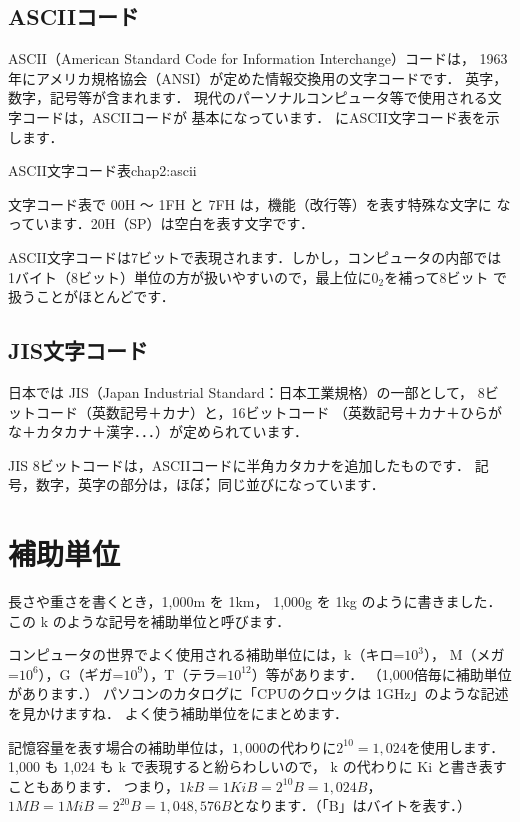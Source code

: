 \subsection{ASCIIコード}
\label{ascii}
ASCII（American Standard Code for Information Interchange）コードは，
1963年にアメリカ規格協会（ANSI）が定めた情報交換用の文字コードです．
英字，数字，記号等が含まれます．
現代のパーソナルコンピュータ等で使用される文字コードは，ASCIIコードが
基本になっています．
にASCII文字コード表を示します．

          {ASCII文字コード表}{chap2:ascii}

文字コード表で 00H 〜 1FH と 7FH は，機能（改行等）を表す特殊な文字に
なっています．20H（SP）は空白を表す文字です．

ASCII文字コードは7ビットで表現されます．しかし，コンピュータの内部では
1バイト（8ビット）単位の方が扱いやすいので，最上位に$0_2$を補って8ビット
で扱うことがほとんどです．

\subsection{JIS文字コード}
日本では JIS（Japan Industrial Standard：日本工業規格）の一部として，
8ビットコード（英数記号＋カナ）と，16ビットコード
（英数記号＋カナ＋ひらがな＋カタカナ＋漢字．．．）が定められています．

JIS 8ビットコードは，ASCIIコードに半角カタカナを追加したものです．
記号，数字，英字の部分は，\.ほ\.ぼ，同じ並びになっています．

\section{補助単位}

長さや重さを書くとき，1,000m を 1km， 1,000g を 1kg のように書きました．
この k のような記号を補助単位と呼びます．

コンピュータの世界でよく使用される補助単位には，k（キロ=$10^3$），
M（メガ=$10^6$），G（ギガ=$10^9$），T（テラ=$10^{12}$）等があります．
（1,000倍毎に補助単位があります．）
パソコンのカタログに「CPUのクロックは 1GHz」のような記述を見かけますね．
よく使う補助単位をにまとめます．

記憶容量を表す場合の補助単位は，$1,000$の代わりに$2^{10} = 1,024$を使用します．
1,000 も 1,024 も k で表現すると紛らわしいので，
k の代わりに Ki と書き表すこともあります．
つまり，$1kB =1KiB = 2^{10}B = 1,024B$，
$1MB =1MiB = 2^{20}B = 1,048,576B$となります．（「B」はバイトを表す．）

